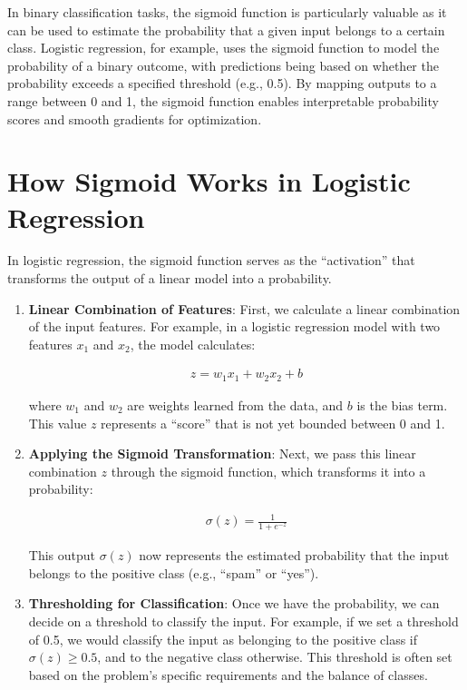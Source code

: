 \documentclass[
  12 pt,
  a4paper,
]{book}
\numberwithin{equation}{section}
\theoremstyle{plain}      %
\theoremstyle{definition} %
\theoremstyle{remark}     %
\theoremstyle{note}         %
\begin{document}
In binary classification tasks, the sigmoid function is particularly
valuable as it can be used to estimate the probability that a given
input belongs to a certain class. Logistic regression, for example, uses
the sigmoid function to model the probability of a binary outcome, with
predictions being based on whether the probability exceeds a specified
threshold (e.g., 0.5). By mapping outputs to a range between 0 and 1,
the sigmoid function enables interpretable probability scores and smooth
gradients for optimization.

\hypertarget{how-sigmoid-works-in-logistic-regression}{%
\section{How Sigmoid Works in Logistic
Regression}\label{how-sigmoid-works-in-logistic-regression}}

In logistic regression, the sigmoid function serves as the
``activation'' that transforms the output of a linear model into a
probability.

\begin{enumerate}
\def\labelenumi{\arabic{enumi}.}
\item
  \textbf{Linear Combination of Features}: First, we calculate a linear
  combination of the input features. For example, in a logistic
  regression model with two features \(x_1\) and \(x_2\), the model
  calculates:

  \begin{align}
  z = w_1 x_1 + w_2 x_2 + b
  \end{align}

  where \(w_1\) and \(w_2\) are weights learned from the data, and \(b\)
  is the bias term. This value \(z\) represents a ``score'' that is not
  yet bounded between 0 and 1.
\item
  \textbf{Applying the Sigmoid Transformation}: Next, we pass this
  linear combination \(z\) through the sigmoid function, which
  transforms it into a probability:

  \begin{align}
  \sigma(z) = \frac{1}{1 + e^{-z}}
  \end{align}

  This output \(\sigma(z)\) now represents the estimated probability
  that the input belongs to the positive class (e.g., ``spam'' or
  ``yes'').
\item
  \textbf{Thresholding for Classification}: Once we have the
  probability, we can decide on a threshold to classify the input. For
  example, if we set a threshold of 0.5, we would classify the input as
  belonging to the positive class if \(\sigma(z) \geq 0.5\), and to the
  negative class otherwise. This threshold is often set based on the
  problem's specific requirements and the balance of classes.
\end{enumerate}
\end{document}
